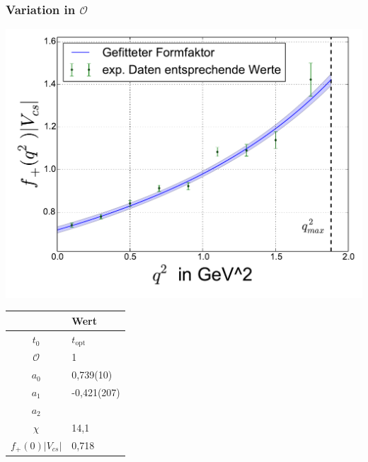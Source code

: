 \documentclass[hyperref={pdfpagelabels=false}]{beamer}
\begin{document}
\begin{frame}
 \frametitle{Variation in $\mathcal{O}$}
  \begin{minipage}[h]{0.66\textwidth}
  \includegraphics[width=1.0\textwidth]{../Fit/D+-1O-topt.pdf}
 \end{minipage}
 \begin{minipage}[h]{0.32\textwidth}
  \begin{table}[h]
   \begin{tabular}{c|l}
   \toprule
     & Wert\\
    \midrule
    $t_0$ & $t_\text{opt}$\\
    $\mathcal{O}$ & 1\\
    \midrule
    $a_0$ & 0,739(10)\\
    $a_1$ & -0,421(207)\\
    $a_2$ & \\
    \midrule
    $\chi$ & 14,1\\
    $f_+(0)|V_{cs}|$ & 0,718\\
    \bottomrule\bottomrule
   \end{tabular}

  \end{table}

 \end{minipage}
\end{frame}
\end{document}

